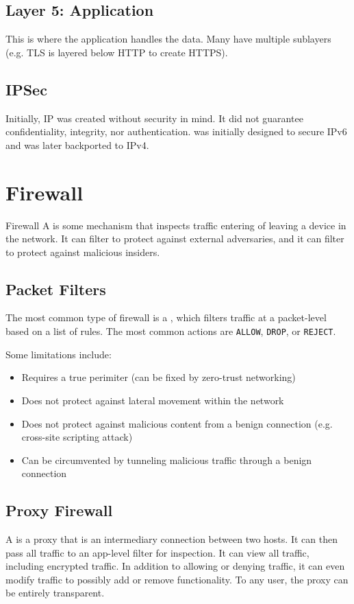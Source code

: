 \subsection*{Layer 5: Application}
This is where the application handles the data. Many have multiple sublayers (e.g. TLS is layered below HTTP to create HTTPS).

\subsection*{IPSec}
Initially, IP was created without security in mind. It did not guarantee confidentiality, integrity, nor authentication.  was initially designed to secure IPv6 and was later backported to IPv4.

\section{Firewall}

\begin{dfnbox}{Firewall}{}
    A  is some mechanism that inspects traffic entering of leaving a device in the network. It can filter  to protect against external adversaries, and it can filter  to protect against malicious insiders.
\end{dfnbox}

\subsection*{Packet Filters}
The most common type of firewall is a , which filters traffic at a packet-level based on a list of rules. The most common actions are \texttt{ALLOW}, \texttt{DROP}, or \texttt{REJECT}.

Some limitations include:
\begin{itemize}
    \item Requires a true perimiter (can be fixed by zero-trust networking)
    \item Does not protect against lateral movement within the network
    \item Does not protect against malicious content from a benign connection (e.g. cross-site scripting attack)
    \item Can be circumvented by tunneling malicious traffic through a benign connection
\end{itemize}

\subsection*{Proxy Firewall}
A  is a proxy that is an intermediary connection between two hosts. It can then pass all traffic to an app-level filter for inspection. It can view all traffic, including encrypted traffic. In addition to allowing or denying traffic, it can even modify traffic to possibly add or remove functionality. To any user, the proxy can be entirely transparent.
